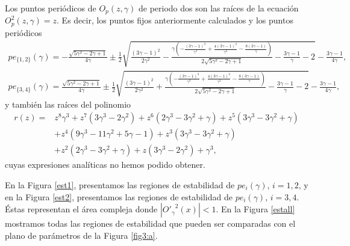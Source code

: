 Los puntos periódicos de $O_{p}(z,\gamma)$ de periodo dos son las raíces de la ecuación $O_{p}^2(z,\gamma)=z$. Es decir, los puntos fijos anteriormente calculados y los puntos periódicos
\begin{equation*}
\begin{array}{ll}
pe_{\{1,2\}}(\gamma)=-\frac{\sqrt{5 \gamma ^2-2 \gamma +1}}{4 \gamma }\pm\frac{1}{2} \sqrt{\frac{(3 \gamma -1)^2}{2 \gamma ^2}-\frac{\gamma  \left(-\frac{(3 \gamma -1)^3}{\gamma ^3}+\frac{4 (3 \gamma -1)^2}{\gamma ^2}-\frac{8 (3 \gamma -1)}{\gamma }\right)}{2 \sqrt{5 \gamma ^2-2 \gamma +1}}-\frac{3 \gamma -1}{\gamma }-2}-\frac{3 \gamma -1}{4 \gamma },\\
pe_{\{3,4\}}(\gamma)=\frac{\sqrt{5 \gamma ^2-2 \gamma +1}}{4 \gamma }\pm\frac{1}{2} \sqrt{\frac{(3 \gamma -1)^2}{2 \gamma ^2}+\frac{\gamma  \left(-\frac{(3 \gamma -1)^3}{\gamma ^3}+\frac{4 (3 \gamma -1)^2}{\gamma ^2}-\frac{8 (3 \gamma -1)}{\gamma }\right)}{2 \sqrt{5 \gamma ^2-2 \gamma +1}}-\frac{3 \gamma -1}{\gamma }-2}-\frac{3 \gamma -1}{4 \gamma },
\end{array}
\end{equation*}
y también las raíces del polinomio
\begin{align*}
	r(z)= & z^8 \gamma ^3+z^7 \left(3 \gamma ^3-2 \gamma ^2\right)+z^6 \left(2 \gamma ^3-3 \gamma ^2+\gamma \right)+z^5 \left(3 \gamma ^3-3 \gamma ^2+\gamma \right)\\\nonumber
	&+z^4 \left(9 \gamma ^3-11 \gamma ^2+5 \gamma -1\right)+z^3  \left(3 \gamma ^3-3 \gamma ^2+\gamma \right)\\\nonumber
	&+z^2 \left(2 \gamma ^3-3 \gamma ^2+\gamma \right)+z \left(3 \gamma ^3-2 \gamma ^2\right)+\gamma ^3,
\end{align*}
cuyas expresiones analíticas no hemos podido obtener.

En la Figura \ref{est1}, presentamos las regiones de estabilidad de
$pe_i(\gamma)$, $i=1,2$, y en la Figura \ref{est2}, presentamos las regiones de estabilidad de $pe_i(\gamma)$, $i=3,4$. Éstas representan el área compleja donde $|{O'_{\gamma}}^2(x)|<1$. En
la Figura \ref{estall} mostramos todas las regiones de estabilidad que pueden ser comparadas con el plano de parámetros de la Figura \ref{fig3:a}.

